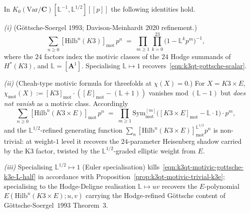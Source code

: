 \begin{theorem}
\label{thm:k3qt-motivic-gottsche-L-half}
In $K_0(\mathrm{Var}/\mathbf C)[\mathbb L^{-1}, \mathbb L^{1/2}]
[\![p]\!]$ the following identities hold.

\emph{(i)} (Göttsche-Soergel $1993$; Davison-Meinhardt 2020 refinement.)
\begin{equation}
\label{eqn:k3qt-motivic-gottsche-k3}
 \sum_{n \geq 0} [\mathrm{Hilb}^n(K3)]_{\mathrm{mot}} \, p^n
 \;=\;
 \prod_{m \geq 1} \prod_{k = 0}^{23}
 \bigl(1 - \mathbb L^{k} p^m\bigr)^{-1},
\end{equation}
where the $24$ factors index the motivic classes of the $24$ Hodge
summands of $H^*(K3)$, and $\mathbb L = [\mathbf A^1]$. Specialising
$\mathbb L \mapsto 1$ recovers~\eqref{eqn:k3qt-gottsche-scalar}.

\emph{(ii)} (Cheah-type motivic formula for threefolds at
$\chi(X) = 0$.) For $X = K3 \times E$,
$\chi_{\mathrm{mot}}(X) := [K3]_{\mathrm{mot}} \cdot ([E]_{\mathrm{mot}}
 - (\mathbb L + 1))$ vanishes mod $(\mathbb L - 1)$ but
\emph{does not vanish} as a motivic class. Accordingly
\begin{equation}
\label{eqn:k3qt-motivic-gottsche-k3e-L-half}
 \sum_{n \geq 0}
 [\mathrm{Hilb}^n(K3 \times E)]_{\mathrm{mot}}\, p^n
 \;=\;
 \prod_{m \geq 1} \mathrm{Sym}^{[m]}_{\mathrm{mot}}\!
 \bigl( [K3 \times E]_{\mathrm{mot}} - \mathbb L \cdot 1 \bigr)
 \cdot p^m,
\end{equation}
and the $\mathbb L^{1/2}$-refined generating function
$\sum_n [\mathrm{Hilb}^n(K3 \times E)]^{\mathbb L^{1/2}}_{\mathrm{mot}}
p^n$ is non-trivial: at weight-$1$ level it recovers the
$24$-parameter Heisenberg shadow carried by the K3 factor, twisted
by the $\mathbb L^{1/2}$-graded elliptic weight from $E$.

\emph{(iii)} Specialising $\mathbb L^{1/2} \mapsto 1$ (Euler
specialisation) kills~\eqref{eqn:k3qt-motivic-gottsche-k3e-L-half}
in accordance with Proposition~\ref{prop:k3qt-motivic-trivial-k3e};
specialising to the Hodge-Deligne realisation
$\mathbb L \mapsto u v$ recovers the $E$-polynomial
$E(\mathrm{Hilb}^n(K3 \times E); u, v)$ carrying the Hodge-refined
Göttsche content of Göttsche-Soergel~$1993$ Theorem~$3$.
\end{theorem}

